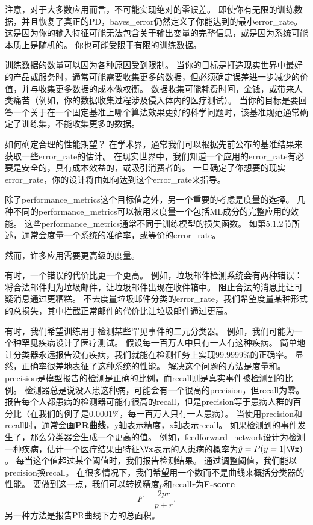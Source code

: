 注意，对于大多数应用而言，不可能实现绝对的零误差。
即使你有无限的训练数据，并且恢复了真正的\gls{PD}，\gls{bayes_error}仍然定义了你能达到的最小\gls{error_rate}。
这是因为你的输入特征可能无法包含关于输出变量的完整信息，或是因为系统可能本质上是随机的。
你也可能受限于有限的训练数据。

训练数据的数量可以因为各种原因受到限制。
当你的目标是打造现实世界中最好的产品或服务时，通常可能需要收集更多的数据，但必须确定误差进一步减少的价值，并与收集更多数据的成本做权衡。
数据收集可能耗费时间，金钱，或带来人类痛苦（例如，你的数据收集过程涉及侵入体内的医疗测试）。
当你的目标是要回答一个关于在一个固定基准上哪个算法效果更好的科学问题时，该基准规范通常确定了训练集，不能收集更多的数据。


如何确定合理的性能期望？
在学术界，通常我们可以根据先前公布的基准结果来获取一些\gls{error_rate}的估计。
在现实世界中，我们知道一个应用的\gls{error_rate}有必要是安全的，具有成本效益的，或吸引消费者的。
一旦确定了你想要的现实\gls{error_rate}，你的设计将由如何达到这个\gls{error_rate}来指导。

除了\gls{performance_metrics}这个目标值之外，另一个重要的考虑是度量的选择。
几种不同的\gls{performance_metrics}可以被用来度量一个包括\gls{ML}成分的完整应用的效能。
这些\gls{performance_metrics}通常不同于训练模型的损失函数。 
如第5.1.2节所述，通常会度量一个系统的准确率，或等价的\gls{error_rate}。

然而，许多应用需要更高级的度量。

有时，一个错误的代价比更一个更高。
例如，垃圾邮件检测系统会有两种错误：将合法邮件归为垃圾邮件，让垃圾邮件出现在收件箱中。
阻止合法的消息比让可疑消息通过更糟糕。
不去度量垃圾邮件分类的\gls{error_rate}，我们希望度量某种形式的总损失，其中拦截正常邮件的代价比让垃圾邮件通过更高。

有时，我们希望训练用于检测某些罕见事件的二元分类器。
例如，我们可能为一个种罕见疾病设计了医疗测试。
假设每一百万人中只有一人有这种疾病。
简单地让分类器永远报告没有疾病，我们就能在检测任务上实现$99.9999\%$的正确率。
显然，正确率很差地表征了这种系统的性能。
解决这个问题的方法是度量和。
\gls{precision}是模型报告的检测是正确的比例，而\gls{recall}则是真实事件被检测到的比例。
检测器总是说没人患这种病，可能会有一个很高的\gls{precision}，但\gls{recall}为零。
报告每个人都患病的检测器可能有很高的\gls{recall}，但是\gls{precision}等于患病人群的百分比（在我们的例子是$0.0001\%$，每一百万人只有一人患病）。
当使用\gls{precision}和\gls{recall}时，通常会画\textbf{PR曲线}，y轴表示精度，x轴表示\gls{recall}。
如果检测到的事件发生了，那么分类器会生成一个更高的值。
例如，\gls{feedforward_network}设计为检测一种疾病，估计一个医疗结果由特征$\Vx$表示的人患病的概率为$\hat{y} = P(y=1|\Vx)$。
每当这个值超过某个阈值时，我们报告检测结果。
通过调整阈值，我们能以\gls{precision}换\gls{recall}。
在很多情况下，我们希望用一个数而不是曲线来概括分类器的性能。
要做到这一点，我们可以转换精度$p$和\gls{recall}$r$为\textbf{F-score}
\begin{equation}
	F = \frac{2pr}{p+r}.
\end{equation}
另一种方法是报告PR曲线下方的总面积。

